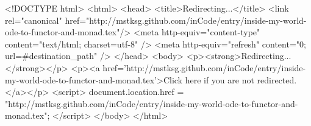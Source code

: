 <!DOCTYPE html>
<html>
<head>
<title>Redirecting...</title>
<link rel="canonical" href="http://mstksg.github.com/inCode/entry/inside-my-world-ode-to-functor-and-monad.tex"/>
<meta http-equiv="content-type" content="text/html; charset=utf-8" />
<meta http-equiv="refresh" content="0; url=#{destination_path}" />
</head>
<body>
  <p><strong>Redirecting...</strong></p>
  <p><a href='http://mstksg.github.com/inCode/entry/inside-my-world-ode-to-functor-and-monad.tex'>Click here if you are not redirected.</a></p>
  <script>
    document.location.href = "http://mstksg.github.com/inCode/entry/inside-my-world-ode-to-functor-and-monad.tex";
  </script>
</body>
</html>
